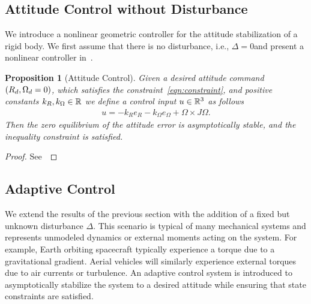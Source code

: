 \documentclass[10pt,fleqn]{IJCAS}  %
\newtheorem{prop}{Proposition}
\providecommand{\DIFadd}[1]{{\protect\color{blue}\uwave{#1}}} %
\providecommand{\DIFaddbegin}{} %
\providecommand{\DIFaddend}{} %
\begin{document}
\begin{multicols}{2}
\subsection{Attitude Control without Disturbance}
We introduce a nonlinear geometric controller for the attitude stabilization of a rigid body.
We first assume that there is no disturbance, i.e., \( \Delta = 0 \)\DIFaddbegin \DIFadd{, }\DIFaddend and present a nonlinear controller in~.
\begin{prop}[Attitude Control]\label{prop:att_control}
	Given a desired attitude command \( \left( R_d, \Omega_d = 0 \right) \), which satisfies the constraint~\cref{eqn:constraint}, and positive constants \( k_R, k_\Omega \in \mathbb{R} \) we define a control input \( u \in \mathbb{R}^3 \) as follows
	\begin{gather}
		u = -k_R e_R - k_\Omega e_\Omega + \Omega \times J \Omega . \label{eqn:nodist_control}
	\end{gather}
	Then the zero equilibrium of the attitude error is asymptotically stable, and the inequality constraint is satisfied.
\end{prop}
\begin{proof}
See~
\end{proof}

\subsection{Adaptive Control}
We extend the results of the previous section with the addition of a fixed but unknown disturbance \( \Delta \).
This scenario is typical of many mechanical systems and represents unmodeled dynamics or external moments acting on the system.
For example, Earth orbiting spacecraft typically experience a torque due to a gravitational gradient.
Aerial vehicles will similarly experience external torques due to air currents or turbulence.
An adaptive control system is introduced to asymptotically stabilize the system to a desired attitude while ensuring that state constraints are satisfied. %


\end{multicols}
\end{document}
